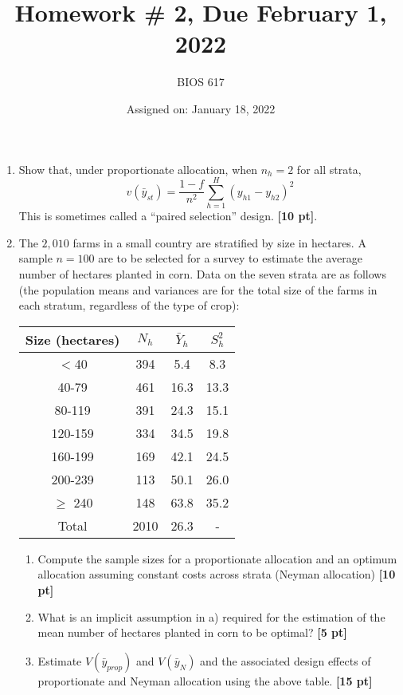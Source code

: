 \documentclass[12pt]{article}
\begin{document}
\title{Homework \# 2, Due February 1, 2022}
\author{BIOS 617}
\date{Assigned on: January 18, 2022}

\maketitle

\begin{enumerate}
\setlength{\itemsep}{15pt}%
\setlength{\parskip}{15pt}%

\item  Show that, under proportionate allocation, when $n_h = 2$ for all strata,
$$
v( \bar y_{st} ) = \frac{1-f}{n^2} \sum_{h=1}^H ( y_{h1} - y_{h2} )^2
$$
This is sometimes called a ``paired selection'' design.  {\bf [10 pt]}.

\item The $2,010$ farms in a small country are stratified by size in hectares. A sample $n = 100$ are to be selected for a survey to estimate the average number of hectares planted in corn. Data on the seven strata are as follows (the population means and variances are for the total size of the farms in each stratum, regardless of the type of crop):

\begin{table}[!th]
\centering
\begin{tabular}{c c c c}
Size (hectares) & $N_h$ & $\bar Y_h$ & $S_h^2$ \\ \hline
$<$40 & 394 & 5.4 & 8.3 \\
40-79 & 461 & 16.3 & 13.3 \\
80-119 & 391 & 24.3 & 15.1 \\
120-159 & 334 & 34.5 & 19.8 \\
160-199 & 169 & 42.1 & 24.5 \\
200-239 & 113 & 50.1 & 26.0 \\
$\geq$ 240 & 148 & 63.8 & 35.2 \\
Total & 2010 & 26.3 & - \\ \hline
\end{tabular}
\end{table}

	\begin{enumerate}
		\item Compute the sample sizes for a proportionate allocation and an optimum allocation assuming constant costs across strata (Neyman allocation) {\bf [10 pt]}
		\item What is an implicit assumption in a) required for the estimation of the mean number of hectares planted in corn to be optimal? {\bf [5 pt]}
		\item Estimate $V(\bar y_{prop} )$ and $V( \bar y_N )$ and the associated design effects of proportionate and Neyman allocation using the above table. {\bf [15 pt]}
	\end{enumerate}


\end{enumerate}
\end{document}
